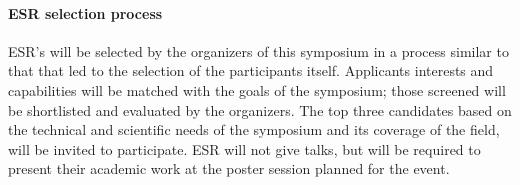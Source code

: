 \paragraph{ESR selection process} ESR's will be selected by the
organizers of this symposium in a process similar to that that led to
the selection of the participants itself. Applicants interests and
capabilities will be matched with the goals of the symposium; those
screened will be shortlisted and evaluated by the organizers. The top
three candidates based on the technical and scientific needs of the
symposium and its coverage of the field, will be invited to
participate. ESR will not give talks, but will be required to present
their academic work at the poster session planned for the event.




